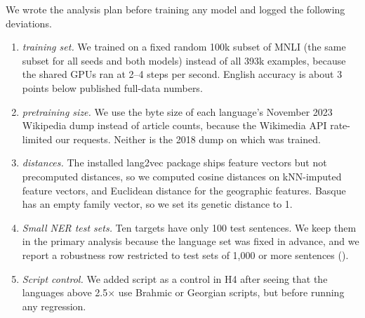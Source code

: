 We wrote the analysis plan before training any model and logged the following deviations.
\begin{enumerate}[leftmargin=*,itemsep=0pt,topsep=0pt]
    \item \emph{\xnli training set.} We trained on a fixed random 100k subset of MNLI (the same subset for all seeds and both models) instead of all 393k examples, because the shared GPUs ran at 2--4 steps per second. English accuracy is about 3 points below published full-data numbers.
    \item \emph{\mbert pretraining size.} We use the byte size of each language's November 2023 Wikipedia dump instead of article counts, because the Wikimedia API rate-limited our requests. Neither is the 2018 dump on which \mbert was trained.
    \item \emph{\uriel distances.} The installed lang2vec package ships feature vectors but not precomputed distances, so we computed cosine distances on kNN-imputed feature vectors, and Euclidean distance for the geographic features. Basque has an empty family vector, so we set its genetic distance to 1.
    \item \emph{Small NER test sets.} Ten \wikiann targets have only 100 test sentences. We keep them in the primary analysis because the language set was fixed in advance, and we report a robustness row restricted to test sets of 1{,}000 or more sentences ().
    \item \emph{Script control.} We added script as a control in H4 after seeing that the \mbert languages above 2.5$\times$ use Brahmic or Georgian scripts, but before running any regression.
\end{enumerate}

